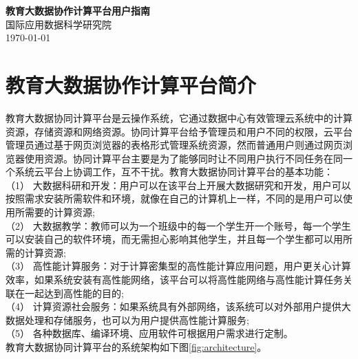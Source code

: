 \documentclass[12pt]{ctexart}%
\begin{document}
\begin{center}
  \Large \textbf{教育大数据协作计算平台用户指南} \\
  \vspace{0.1in}
  \normalsize 国际应用数据科学研究院 \\
  \today
\end{center}

\tableofcontents
\newpage

\section {教育大数据协作计算平台简介}
教育大数据协同计算平台是云操作系统，它通过数据中心有效管理云系统中的计算资源，存储资源和网络资源。协同计算平台给予管理员和用户不同的权限，云平台管理员通过基于网页浏览器的表格形式管理系统资源，然而普通用户则通过网页浏览器使用资源。协同计算平台主要是为了能够同时让不同用户执行不同任务在同一个系统云平台上协调工作，互不干扰。教育大数据协同计算平台的基本功能： \\
（1） 大数据科研和开发：用户可以在该平台上开展大数据研究和开发，用户可以按照需求安装所需软件和环境，就像在自己的计算机上一样，不同的是用户可以使用所需要的计算资源; \\
（2） 大数据教学：教师可以为一个班级中的每一个学生开一个账号，每一个学生可以安装自己的软件环境，而无需担心影响其他学生，并且每一个学生都可以用所需的计算资源; \\
（3） 高性能计算服务：对于计算密集型的高性能计算应用问题，用户更关心计算效率，如果系统安装有高性能网络，该平台可以将高性能网络与高性能计算任务关联在一起达到高性能的目的; \\
（4） 计算资源社会服务：如果系统具有外部网络，该系统可以对外部用户提供大数据处理和存储服务，也可以为用户提供高性能计算服务; \\
（5） 各种数据库、编译环境、应用软件可根据用户需求进行定制。\\
教育大数据协同计算平台的系统架构如下图\ref{fig:architecture}。
\end{document}
